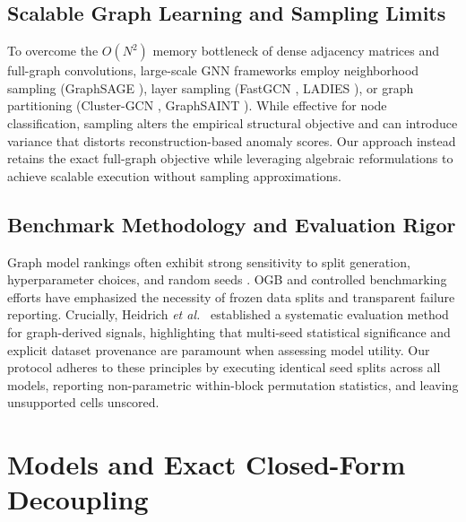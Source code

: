 \documentclass[11pt,a4paper]{article}
\newcommand{\etal}{\emph{et al.}}
\begin{document}
\subsection{Scalable Graph Learning and Sampling Limits}
To overcome the $O(N^2)$ memory bottleneck of dense adjacency matrices and full-graph convolutions, large-scale GNN frameworks employ neighborhood sampling (GraphSAGE \cite{hamilton2017graphsage}), layer sampling (FastGCN \cite{chen2018fastgcn}, LADIES \cite{zou2019ladies}), or graph partitioning (Cluster-GCN \cite{chiang2019clustergcn}, GraphSAINT \cite{zeng2020graphsaint}). While effective for node classification, sampling alters the empirical structural objective and can introduce variance that distorts reconstruction-based anomaly scores. Our approach instead retains the exact full-graph objective while leveraging algebraic reformulations to achieve scalable execution without sampling approximations.

\subsection{Benchmark Methodology and Evaluation Rigor}
Graph model rankings often exhibit strong sensitivity to split generation, hyperparameter choices, and random seeds \cite{shchur2018pitfalls,errica2020fair}. OGB \cite{hu2020ogb} and controlled benchmarking efforts \cite{dwivedi2023benchmarking} have emphasized the necessity of frozen data splits and transparent failure reporting. Crucially, Heidrich \etal\ \cite{heidrich2026systematic} established a systematic evaluation method for graph-derived signals, highlighting that multi-seed statistical significance and explicit dataset provenance are paramount when assessing model utility. Our protocol adheres to these principles by executing identical seed splits across all models, reporting non-parametric within-block permutation statistics, and leaving unsupported cells unscored.

\section{Models and Exact Closed-Form Decoupling}
\label{sec:models}
\end{document}
